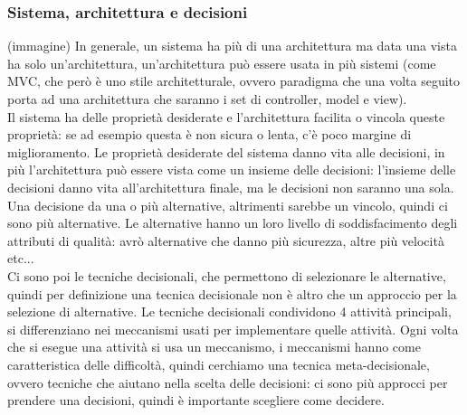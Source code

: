 \documentclass{article}
\begin{document}
\subsubsection{Sistema, architettura e decisioni}
(immagine)
In generale, un sistema ha più di una architettura ma data una vista ha solo un'architettura, un'architettura può essere usata in più sistemi (come MVC, che però è uno stile architetturale, ovvero paradigma che una volta seguito porta ad una architettura che saranno i set di controller, model e view). \\ Il sistema ha delle proprietà desiderate e l'architettura facilita o vincola queste proprietà: se ad esempio questa è non sicura o lenta, c'è poco margine di miglioramento. Le proprietà desiderate del sistema danno vita alle decisioni, in più l'architettura può essere vista come un insieme delle decisioni: l'insieme delle decisioni danno vita all'architettura finale, ma le decisioni non saranno una sola. Una decisione da una o più alternative, altrimenti sarebbe un vincolo, quindi ci sono più alternative. Le alternative hanno un loro livello di soddisfacimento degli attributi di qualità: avrò alternative che danno più sicurezza, altre più velocità etc...\\ Ci sono poi le tecniche decisionali, che permettono di selezionare le alternative, quindi per definizione una tecnica decisionale non è altro che un approccio per la selezione di alternative. Le tecniche decisionali condividono 4 attività principali, si differenziano nei meccanismi usati per implementare quelle attività. Ogni volta che si esegue una attività si usa un meccanismo, i meccanismi hanno come caratteristica delle difficoltà, quindi cerchiamo una tecnica meta-decisionale, ovvero tecniche che aiutano nella scelta delle decisioni: ci sono più approcci per prendere una decisioni, quindi è importante scegliere come decidere.
\end{document}
